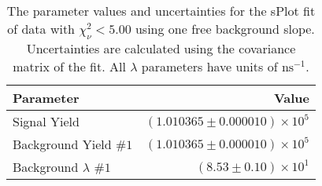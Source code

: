 
\begin{table}[ht]
    \begin{center}
        \begin{tabular}{lr}\toprule
            Parameter & Value \\\midrule
            Signal Yield & $(1.010365 \pm 0.000010) \times 10^{5}$ \\
            Background Yield $\#1$ & $(1.010365 \pm 0.000010) \times 10^{5}$ \\
            Background $\lambda$ $\#1$ & $(8.53 \pm 0.10) \times 10^{1}$ \\\bottomrule
        \end{tabular}
        \caption{The parameter values and uncertainties for the sPlot fit of data with $\chi^2_\nu < 5.00$ using one free background slope. Uncertainties are calculated using the covariance matrix of the fit. All $\lambda$ parameters have units of $\si{\nano\second}^{-1}$.}\label{tab:splot-fit-results-chisqdof-5.00-free-1}
    \end{center}
\end{table}
